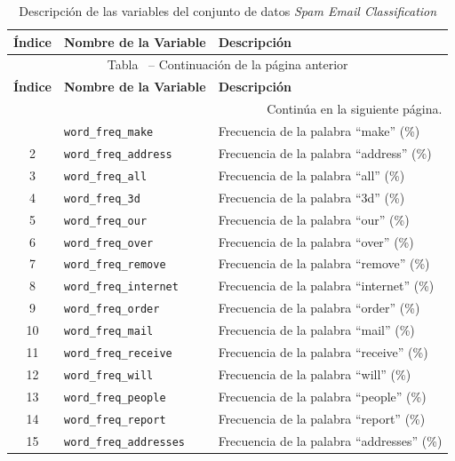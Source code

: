\documentclass[a4paper,11pt ,openany]{book}
\renewcommand{\tablename}{Tabla}
\begin{document}
\begin{longtable}{|c|l|l|}
\caption{Descripción de las variables del conjunto de datos \textit{Spam Email Classification}} \label{tab:variables_spambase} \\
\hline
\textbf{Índice} & \textbf{Nombre de la Variable} & \textbf{Descripción} \\ \hline
\endfirsthead
\multicolumn{3}{c}{{ \tablename\ \thetable{} -- Continuación de la página anterior}} \\
\hline
\textbf{Índice} & \textbf{Nombre de la Variable} & \textbf{Descripción} \\ \hline
\endhead
\hline \multicolumn{3}{|r|}{{Continúa en la siguiente página.}} \\ \hline
\endfoot
\hline \hline
\endlastfoot
1 & \texttt{word\_freq\_make} & Frecuencia de la palabra ``make'' (\%) \\ \hline
2 & \texttt{word\_freq\_address} & Frecuencia de la palabra ``address'' (\%) \\ \hline
3 & \texttt{word\_freq\_all} & Frecuencia de la palabra ``all'' (\%) \\ \hline
4 & \texttt{word\_freq\_3d} & Frecuencia de la palabra ``3d'' (\%) \\ \hline
5 & \texttt{word\_freq\_our} & Frecuencia de la palabra ``our'' (\%) \\ \hline
6 & \texttt{word\_freq\_over} & Frecuencia de la palabra ``over'' (\%) \\ \hline
7 & \texttt{word\_freq\_remove} & Frecuencia de la palabra ``remove'' (\%) \\ \hline
8 & \texttt{word\_freq\_internet} & Frecuencia de la palabra ``internet'' (\%) \\ \hline
9 & \texttt{word\_freq\_order} & Frecuencia de la palabra ``order'' (\%) \\ \hline
10 & \texttt{word\_freq\_mail} & Frecuencia de la palabra ``mail'' (\%) \\ \hline
11 & \texttt{word\_freq\_receive} & Frecuencia de la palabra ``receive'' (\%) \\ \hline
12 & \texttt{word\_freq\_will} & Frecuencia de la palabra ``will'' (\%) \\ \hline
13 & \texttt{word\_freq\_people} & Frecuencia de la palabra ``people'' (\%) \\ \hline
14 & \texttt{word\_freq\_report} & Frecuencia de la palabra ``report'' (\%) \\ \hline
15 & \texttt{word\_freq\_addresses} & Frecuencia de la palabra ``addresses'' (\%) \\ \hline

\end{longtable}
\end{document}
